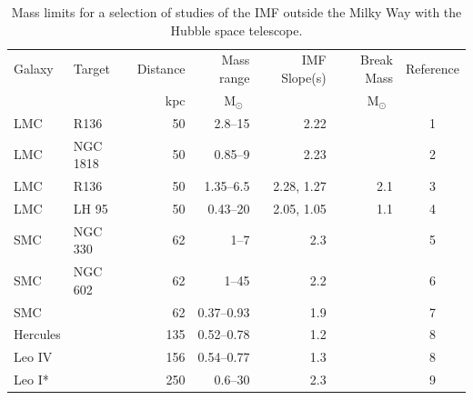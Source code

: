 \documentclass[referee]{aa}
\newcommand{\msun}{M$_\odot$~}
\begin{document}
\begin{table}

    \centering
    \caption{Mass limits for a selection of studies of the IMF outside the Milky Way with the Hubble space telescope. }
    \label{tbl:imf_lit_review}

    \begin{tabular}{ l l r r r r c }
        \hline
        \hline
        Galaxy   &  Target      &  Distance &  Mass range       & IMF Slope(s) & Break Mass          & Reference         \\
                &               & kpc       & \msun             &              & \msun               &                   \\
        \hline
        LMC      &  R136        & 50        & 2.8--15            & 2.22         &                     & 1 \\
        LMC      &  NGC 1818    & 50        & 0.85--9            & 2.23         &                     & 2  \\
        LMC      &  R136        & 50        & 1.35--6.5          & 2.28, 1.27   & 2.1                 & 3     \\
        LMC      &  LH 95       & 50        & 0.43--20           & 2.05, 1.05   & 1.1                 & 4      \\
        \hline
        SMC      &  NGC 330     & 62        & 1--7               & 2.3          &                     & 5    \\
        SMC      &  NGC 602     & 62        & 1--45              & 2.2          &                     & 6     \\
        SMC      &              & 62        & 0.37--0.93         & 1.9          &                     & 7     \\
        \hline
        Hercules &              & 135       & 0.52--0.78         & 1.2          &                     & 8         \\
        Leo IV   &              & 156       & 0.54--0.77         & 1.3          &                     & 8         \\
        Leo I*   &              & 250       & 0.6--30            & 2.3          &                     & 9     \\
        \hline
        \end{tabular}


\end{table}
\end{document}
